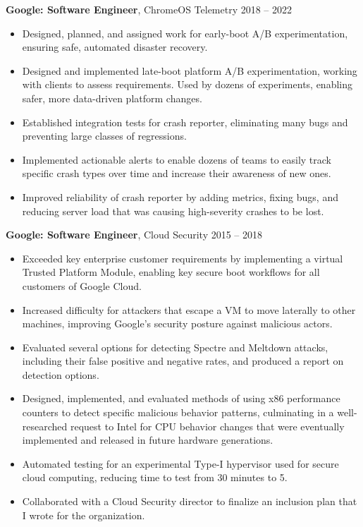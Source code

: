 \documentclass[overlapped]{res}
\newcommand{\experience}[5]{
    \textbf{#3}, #4 \hfill #1 -- #2 \\
    #5
}
\begin{document}
\begin{resume}
  \experience{2018}{2022}{Google: Software Engineer}{ChromeOS Telemetry}{
    \begin{itemize} \itemsep -1pt
        \item Designed, planned, and assigned work for early-boot A/B
          experimentation, ensuring safe, automated disaster recovery.
       \item Designed and implemented late-boot platform A/B experimentation,
         working with clients to assess requirements. Used by dozens of
         experiments, enabling safer, more data-driven platform changes.
        \item Established integration tests for crash reporter, eliminating many
          bugs and preventing large classes of regressions.
        \item Implemented actionable alerts to enable dozens of teams to easily
          track specific crash types over time and increase their awareness of
          new ones.
        \item Improved reliability of crash reporter by adding metrics, fixing
          bugs, and reducing server load that was causing high-severity crashes
          to be lost.
    \end{itemize}
  }

  \experience{2015}{2018}{Google: Software Engineer}{Cloud Security}{
    \begin{itemize} \itemsep -1pt
        \item Exceeded key enterprise customer requirements by implementing
          a virtual Trusted Platform Module, enabling key secure boot workflows
          for all customers of Google Cloud.
        \item Increased difficulty for attackers that escape a VM to move
          laterally to other machines, improving Google's security posture
          against malicious actors.
        \item Evaluated several options for detecting Spectre and Meltdown
          attacks, including their false positive and negative rates, and
          produced a report on detection options.
        \item Designed, implemented, and evaluated methods of using x86
          performance counters to detect specific malicious behavior patterns,
          culminating in a well-researched request to Intel for CPU behavior
          changes that were eventually implemented and released in future
          hardware generations.
        \item Automated testing for an experimental Type-I hypervisor used for
          secure cloud computing, reducing time to test from 30 minutes to 5.
        \item Collaborated with a Cloud Security director to finalize an
          inclusion plan that I wrote for the organization.
    \end{itemize}
  }


\end{resume}
\end{document}
